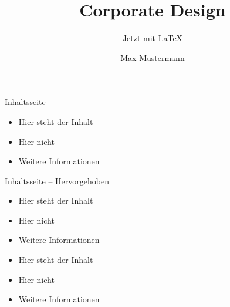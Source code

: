 \documentclass{beamer}
\begin{document}
\title{Corporate Design}
\subtitle{Jetzt mit \LaTeX}
\author{Max Mustermann}

\begin{frame}{Inhaltsseite}
  \begin{itemize}
    \item Hier steht der Inhalt
    \item Hier nicht
    \item Weitere Informationen
  \end{itemize}
\end{frame}

\begin{frame}[highlight]{Inhaltsseite -- Hervorgehoben}
  \begin{itemize}
    \item Hier steht der Inhalt
    \item Hier nicht
    \item Weitere Informationen
  \end{itemize}
\end{frame}

\begin{frame}[notitle]
  \begin{itemize}
    \item Hier steht der Inhalt
    \item Hier nicht
    \item Weitere Informationen
  \end{itemize}
\end{frame}
\end{document}
